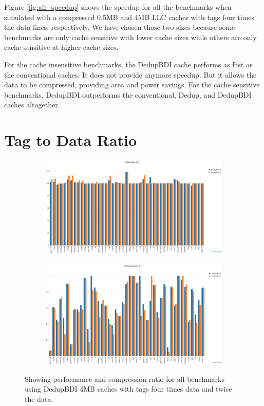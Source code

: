 Figure \ref{fig:all_speedup} shows the speedup for all the benchmarks when simulated with a compressed 0.5MB and 4MB LLC caches with tags four times the data lines, respectively. We have chosen those two sizes because some benchmarks are only cache sensitive with lower cache sizes while others are only cache sensitive at higher cache sizes.\par
For the cache insensitive benchmarks, the DedupBDI cache performs as fast as the conventional caches. It does not provide anymore speedup. But it allows the data to be compressed, providing area and power savings. For the cache sensitive benchmarks, DedupBDI outperforms the conventional, Dedup, and DedupBDI caches altogether.

\section{Tag to Data Ratio}
\label{sec:tagratio}
\begin{figure}
    \begin{subfigure}{\textwidth}
        \includegraphics[width=\textwidth]{compare-speedup.png}
    \end{subfigure}
    \begin{subfigure}{\textwidth}
        \includegraphics[width=\textwidth]{compare-compression.png}
    \end{subfigure}
    \caption[All benchmarks: Tag Ratio]{Showing performance and compression ratio for all benchmarks using DedupBDI 4MB caches with tags four times data and twice the data.}
    \label{fig:all_compare}
\end{figure}
